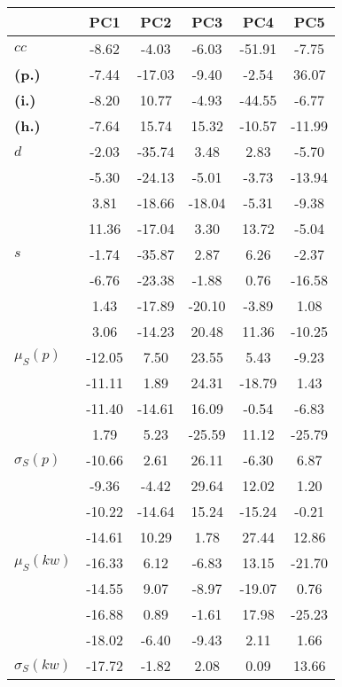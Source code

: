 \begin{table}[h!]
\begin{center}
\begin{tabular}{| l || c | c | c | c | c |}\hline
 & {\bf PC1} & {\bf PC2} & {\bf PC3} & {\bf PC4} & {\bf PC5} \\\hline\hline
{\bf $cc$} & -8.62 & -4.03 & -6.03 & -51.91 & -7.75 \\
{\bf (p.)} & -7.44 & -17.03 & -9.40 & -2.54 & 36.07 \\
{\bf (i.)} & -8.20 & 10.77 & -4.93 & -44.55 & -6.77 \\
{\bf (h.)} & -7.64 & 15.74 & 15.32 & -10.57 & -11.99 \\\hline
{\bf $d$} & -2.03 & -35.74 & 3.48 & 2.83 & -5.70 \\
{\bf } & -5.30 & -24.13 & -5.01 & -3.73 & -13.94 \\
{\bf } & 3.81 & -18.66 & -18.04 & -5.31 & -9.38 \\
{\bf } & 11.36 & -17.04 & 3.30 & 13.72 & -5.04 \\\hline
{\bf $s$} & -1.74 & -35.87 & 2.87 & 6.26 & -2.37 \\
{\bf } & -6.76 & -23.38 & -1.88 & 0.76 & -16.58 \\
 & 1.43  & -17.89  & -20.10  & -3.89  & 1.08 \\
 & 3.06  & -14.23  & 20.48  & 11.36  & -10.25 \\\hline
$\mu_S(p)$ & -12.05  & 7.50  & 23.55  & 5.43  & -9.23 \\
 & -11.11  & 1.89  & 24.31  & -18.79  & 1.43 \\
 & -11.40  & -14.61  & 16.09  & -0.54  & -6.83 \\
 & 1.79  & 5.23  & -25.59  & 11.12  & -25.79 \\\hline
$\sigma_S(p)$ & -10.66  & 2.61  & 26.11  & -6.30  & 6.87 \\
 & -9.36  & -4.42  & 29.64  & 12.02  & 1.20 \\
 & -10.22  & -14.64  & 15.24  & -15.24  & -0.21 \\
 & -14.61  & 10.29  & 1.78  & 27.44  & 12.86 \\\hline
$\mu_S(kw)$ & -16.33  & 6.12  & -6.83  & 13.15  & -21.70 \\
 & -14.55  & 9.07  & -8.97  & -19.07  & 0.76 \\
 & -16.88  & 0.89  & -1.61  & 17.98  & -25.23 \\
 & -18.02  & -6.40  & -9.43  & 2.11  & 1.66 \\\hline
$\sigma_S(kw)$ & -17.72  & -1.82  & 2.08  & 0.09  & 13.66 \\

\end{tabular}
\end{center}
\end{table}
